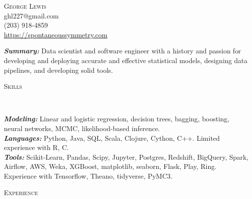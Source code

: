 \documentclass[9pt]{article}
\newenvironment{changemargin}[2]{%
  \begin{list}{}{%
    \setlength{\topsep}{0pt}%
    \setlength{\leftmargin}{#1}%
    \setlength{\rightmargin}{#2}%
    \setlength{\listparindent}{\parindent}%
    \setlength{\itemindent}{\parindent}%
    \setlength{\parsep}{\parskip}%
  }%
  \item[]}{\end{list}
}
\newcommand{\lineover}{
  \begin{changemargin}{-0.05in}{-0.05in}
    \vspace*{-8pt}
    \hrulefill \\
    \vspace*{-2pt}
  \end{changemargin}
}
\newcommand{\header}[1]{
  \begin{changemargin}{-0.5in}{-0.5in}
    \scshape{#1}\\
    \lineover
  \end{changemargin}
}
\newcommand{\contact}[4]{
  \begin{changemargin}{-0.5in}{-0.5in}
    \begin{center}
      {\Large \scshape {#1}}\\ \smallskip
      {#2}\\ \smallskip
      {#3}\\ \smallskip
      {#4}\smallskip
    \end{center}
  \end{changemargin}
}
\newenvironment{body} {
  \vspace*{-16pt}
\begin{changemargin}{-0.25in}{-0.5in}
  }
{\end{changemargin}
}
\begin{document}
\contact{George Lewis}
        {ghl227@gmail.com}
        {(203) 918-4859}
        {\url{https://spontaneoussymmetry.com}}
\smallskip

\begin{body}
  \vspace{14pt}
  \emph{\textbf{Summary:}}{} Data scientist and software engineer with a history and passion for developing and deploying accurate and effective statistical models, designing data pipelines, and developing solid tools. %


\end{body}

\smallskip

\header{Skills}
\begin{body}
  \vspace{14pt}
  \emph{\textbf{Modeling:}}{} Linear and logistic regression, decision trees, bagging, boosting, neural networks, MCMC, likelihood-based inference. \\
  \emph{\textbf{Languages:}}{} Python, Java, SQL, Scala, Clojure, Cython, C++.  Limited experience with R, C. \\
  \smallskip
  \emph{\textbf{Tools:}}{} Scikit-Learn, Pandas, Scipy, Jupyter, Postgres, Redshift, BigQuery, Spark, Airflow, AWS, Weka, XGBoost, matplotlib, seaborn, Flask, Play, Ring.  Experience with Tensorflow, Theano, tidyverse, PyMC3.  \\
\end{body}

\smallskip

\header{Experience}
\end{document}

